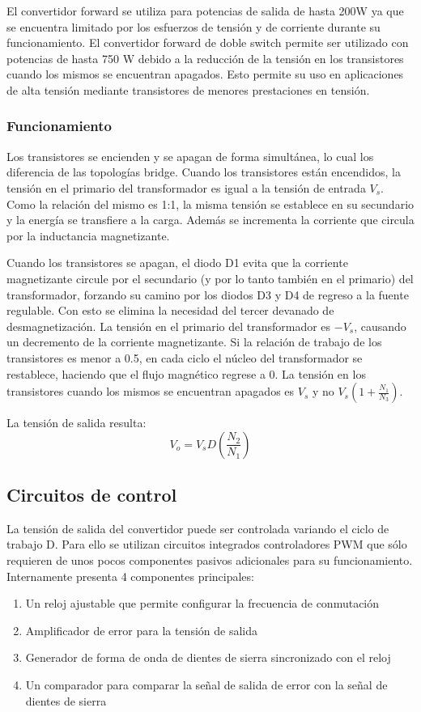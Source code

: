 El convertidor forward se utiliza para potencias de salida de hasta 200W ya que se encuentra limitado 
por los esfuerzos de tensión y de corriente durante su funcionamiento. 
El convertidor forward de doble switch permite ser utilizado con potencias de hasta 750 W debido a la 
reducción de la tensión en los transistores cuando los mismos se encuentran apagados. 
Esto permite su uso en aplicaciones de alta tensión mediante transistores de menores prestaciones en tensión. 

\subsubsection{Funcionamiento}

Los transistores se encienden y se apagan de forma simultánea, lo cual los diferencia de las topologías bridge. 
Cuando los transistores están encendidos, la tensión en el primario del transformador es igual a la tensión de entrada $V_s$. 
Como la relación del mismo es 1:1, la misma tensión se establece en su secundario y la energía se transfiere a la carga. 
Además se incrementa la corriente que circula por la inductancia magnetizante. 

Cuando los transistores se apagan, el diodo D1 evita que la corriente magnetizante circule por el secundario 
(y por lo tanto también en el primario) del transformador, forzando su camino por los diodos D3 y D4 de regreso a la fuente regulable.  
Con esto se elimina la necesidad del tercer devanado de desmagnetización. 
La tensión en el primario del transformador es $-V_s$, causando un decremento de la corriente magnetizante. 
Si la relación de trabajo de los transistores es menor a 0.5, en cada ciclo el núcleo del transformador se restablece, 
haciendo que el flujo magnético regrese a 0. 
La tensión en los transistores cuando los mismos se encuentran apagados es $V_s$ y no $V_s\left(1+\frac{N_1}{N_3}\right)$.

La tensión de salida resulta:
$$ V_{o}=V_{s}D\left(\frac{N_{2}}{N_{1}}\right) $$

\subsection{Circuitos de control}

La tensión de salida del convertidor puede ser controlada variando el ciclo de trabajo D. 
Para ello se utilizan circuitos integrados controladores PWM que sólo requieren de unos pocos componentes pasivos adicionales para su funcionamiento. 
Internamente presenta 4 componentes principales:
\begin{enumerate}
    \item Un reloj ajustable que permite configurar la frecuencia de conmutación
    \item Amplificador de error para la tensión de salida
    \item Generador de forma de onda de dientes de sierra sincronizado con el reloj
    \item Un comparador para comparar la señal de salida de error con la señal de dientes de sierra
\end{enumerate}

